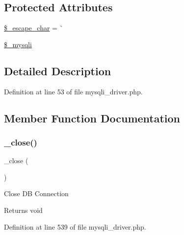 \subsection*{Protected Attributes}
\begin{DoxyCompactItemize}
\item 
\mbox{\hyperlink{class_c_i___d_b__mysqli__driver_aaec2fb0112850159063a8e47ad3aed6e}{\$\+\_\+escape\+\_\+char}} = \textquotesingle{}\`{}\textquotesingle{}
\item 
\mbox{\hyperlink{class_c_i___d_b__mysqli__driver_ade098f0cd94dc706b24ea590bd540bf4}{\$\+\_\+mysqli}}
\end{DoxyCompactItemize}


\subsection{Detailed Description}


Definition at line 53 of file mysqli\+\_\+driver.\+php.



\subsection{Member Function Documentation}
\mbox{\label{class_c_i___d_b__mysqli__driver_a4d9082658000e5ede8312067c6dda9db}} 
\subsubsection{\texorpdfstring{\_close()}{\_close()}}
{\footnotesize\ttfamily \+\_\+close (\begin{DoxyParamCaption}{ }\end{DoxyParamCaption})\hspace{0.3cm}{\ttfamily [protected]}}

Close DB Connection

\begin{DoxyReturn}{Returns}
void 
\end{DoxyReturn}


Definition at line 539 of file mysqli\+\_\+driver.\+php.

\mbox{\label{class_c_i___d_b__mysqli__driver_a2b808d420d8e9fea0b73ad7127f5efb8}} 

